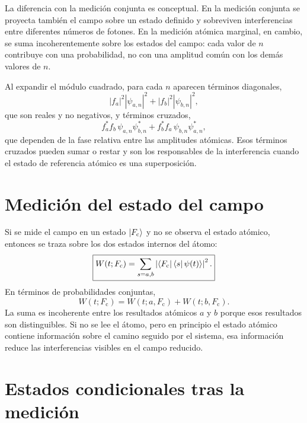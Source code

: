\documentclass[11pt]{article}
\begin{document}
La diferencia con la medici\'on conjunta es conceptual. En la medici\'on
conjunta se proyecta tambi\'en el campo sobre un estado definido y sobreviven
interferencias entre diferentes n\'umeros de fotones. En la medici\'on
at\'omica marginal, en cambio, se suma incoherentemente sobre los estados del
campo: cada valor de $n$ contribuye con una probabilidad, no con una amplitud
com\'un con los dem\'as valores de $n$.

Al expandir el m\'odulo cuadrado, para cada $n$ aparecen t\'erminos diagonales,
\begin{equation}
  |f_a|^2|\psi_{a,n}|^2
  +
  |f_b|^2|\psi_{b,n}|^2,
\end{equation}
que son reales y no negativos, y t\'erminos cruzados,
\begin{equation}
  f_a^*f_b\,\psi_{a,n}\psi_{b,n}^*
  +
  f_b^*f_a\,\psi_{b,n}\psi_{a,n}^*,
\end{equation}
que dependen de la fase relativa entre las amplitudes at\'omicas. Esos
t\'erminos cruzados pueden sumar o restar y son los responsables de la
interferencia cuando el estado de referencia at\'omico es una superposici\'on.

\section{Medici\'on del estado del campo}

Si se mide el campo en un estado $\ket{F_{\mathrm{c}}}$ y no se observa el
estado at\'omico, entonces se traza sobre los dos estados internos del \'atomo:
\begin{equation}
  \boxed{
  W(t;F_{\mathrm{c}})
  =
  \sum_{s=a,b}
  \left|
  \bra{F_{\mathrm{c}}}\bra{s}\psi(t)\rangle
  \right|^2 .
  }
\end{equation}
En t\'erminos de probabilidades conjuntas,
\begin{equation}
  W(t;F_{\mathrm{c}})
  =
  W(t;a,F_{\mathrm{c}})
  +
  W(t;b,F_{\mathrm{c}}).
\end{equation}
La suma es incoherente entre los resultados at\'omicos $a$ y $b$ porque esos
resultados son distinguibles. Si no se lee el \'atomo, pero en principio el
estado at\'omico contiene informaci\'on sobre el camino seguido por el sistema,
esa informaci\'on reduce las interferencias visibles en el campo reducido.

\section{Estados condicionales tras la medici\'on}
\end{document}
